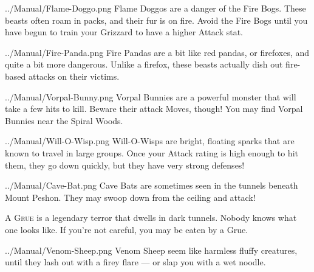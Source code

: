 \documentclass[10pt,twocolumn,openany,article]{memoir}
\begin{document}
\vspace{14pt}

\lettrine[image=true,                lines=5,               findent=3pt,
nindent=3pt]{../Manual/Flame-Doggo.png}{} Flame Doggos are a danger of
the Fire  Bogs. These beasts  often roam in packs,  and their fur  is on
fire. Avoid the Fire Bogs until you have begun to train your Grizzard to
have a higher Attack stat.

\vspace{14pt}

\lettrine[image=true,                lines=5,               findent=3pt,
nindent=3pt]{../Manual/Fire-Panda.png}{} Fire Pandas are a bit like red
pandas, or firefoxes, and quite a  bit more dangerous. Unlike a firefox,
these beasts actually dish out fire-based attacks on their victims.

\vspace{14pt}

\lettrine[image=true,                lines=5,               findent=3pt,
nindent=3pt]{../Manual/Vorpal-Bunny.png}{} Vorpal Bunnies are a powerful
monster that  will take a few  hits to kill. Beware  their attack Moves,
though! You may find Vorpal Bunnies near the Spiral Woods.

\pagebreak

\lettrine[image=true,                lines=5,               findent=3pt,
nindent=3pt]{../Manual/Will-O-Wisp.png}{} Will-O-Wisps are bright,
floating sparks  that are  known to  travel in  large groups.  Once your
Attack rating is high enough to hit them, they go down quickly, but they
have very strong defenses!

\vspace{14pt}

\lettrine[image=true,                lines=5,               findent=3pt,
nindent=3pt]{../Manual/Cave-Bat.png}{} Cave Bats are sometimes seen in
the tunnels beneath  Mount Peshon. They may swoop down  from the ceiling
and attack!

\vspace{14pt}

\textsc{A  Grue} is  a legendary  terror  that dwells  in dark  tunnels.
Nobody knows  what one  looks like.  If you're not  careful, you  may be
eaten by a Grue.

\vspace{14pt}

\lettrine[image=true,                lines=5,               findent=3pt,
nindent=3pt]{../Manual/Venom-Sheep.png}{} Venom Sheep seem like harmless
fluffy creatures, until they lash out with a firey flare --- or slap you
with a wet noodle.
\end{document}
